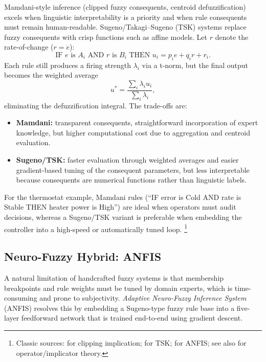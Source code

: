 Mamdani-style inference (clipped fuzzy consequents, centroid defuzzification) excels when linguistic interpretability is a priority and when rule consequents must remain human-readable.
Sugeno/Takagi--Sugeno (TSK) systems replace fuzzy consequents with crisp functions such as affine models. Let \(r\) denote the rate-of-change (\(r=\dot{e}\)):
\[
\text{IF } e \text{ is } A_i \text{ AND } r \text{ is } B_i \text{ THEN } u_i = p_i e + q_i r + r_i.
\]
Each rule still produces a firing strength $\lambda_i$ via a t\hyp{}norm, but the final output becomes the weighted average
\[
u^\ast = \frac{\sum_i \lambda_i u_i}{\sum_i \lambda_i},
\]
eliminating the defuzzification integral. The trade-offs are:
\begin{itemize}
    \item \textbf{Mamdani:} transparent consequents, straightforward incorporation of expert knowledge, but higher computational cost due to aggregation and centroid evaluation.
    \item \textbf{Sugeno/TSK:} faster evaluation through weighted averages and easier gradient-based tuning of the consequent parameters, but less interpretable because consequents are numerical functions rather than linguistic labels.
\end{itemize}
For the thermostat example, Mamdani rules (``IF error is Cold AND rate is Stable THEN heater power is High'') are ideal when operators must audit decisions, whereas a Sugeno/TSK variant is preferable when embedding the controller into a high-speed or automatically tuned loop.
\footnote{Classic sources: \citet{Mamdani1975} for clipping implication; \citet{TakagiSugeno1985} for TSK; \citet{Jang1993} for ANFIS; see also \citep{Klement2000,Dubois1988} for operator/implicator theory.}

\subsection{Neuro-Fuzzy Hybrid: ANFIS}
\label{sec:fuzzyinference_anfis}

A natural limitation of handcrafted fuzzy systems is that membership breakpoints and rule weights must be tuned by domain experts, which is time-consuming and prone to subjectivity. \emph{Adaptive Neuro-Fuzzy Inference System} (ANFIS) \citep{Jang1993} resolves this by embedding a Sugeno-type fuzzy rule base into a five-layer feedforward network that is trained end-to-end using gradient descent.

